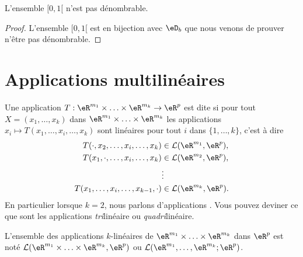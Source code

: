 \begin{corollary}
    L'ensemble \( \mathopen[ 0 , 1 [\) n'est pas dénombrable.
\end{corollary}

\begin{proof}
    L'ensemble \( \mathopen[ 0 , 1 [\) est en bijection avec \( \eD_b\) que nous venons de prouver n'être pas dénombrable.
\end{proof}

\section{Applications multilinéaires}

\begin{definition}       \label{DefFRHooKnPCT}
    Une application $T: \eR^{m_1}\times \ldots \times\eR^{m_k}\to\eR^p $ est dite  si pour tout $X=(x_1, \ldots,x_k)$ dans $ \eR^{m_1}\times \ldots \times\eR^{m_k}$ les applications $x_i\mapsto T(x_1, \ldots, x_i,\ldots,x_k)$ sont linéaires pour tout $i$ dans $\{1,\ldots,k\}$, c'est à dire
	\begin{equation}
		\begin{aligned}[]
			T(\cdot,x_2, \ldots, x_i,\ldots,x_k)&\in \mathcal{L}(\eR^{m_1}, \eR^p),\\
			T(x_1,\cdot, \ldots, x_i,\ldots,x_k)&\in \mathcal{L}(\eR^{m_2}, \eR^p),\\
						& \vdots\\
			T(x_1, \ldots, x_i,\ldots,x_{k-1},\cdot)&\in \mathcal{L}(\eR^{m_k}, \eR^p).\\
		\end{aligned}
	\end{equation}
	En particulier lorsque $k=2$, nous parlons d'applications . Vous pouvez deviner ce que sont les applications \emph{tri}linéaire ou \emph{quadri}linéaire.
\end{definition}

L'ensemble des applications $k$-linéaires de $ \eR^{m_1}\times \ldots \times\eR^{m_k}$ dans $\eR^p$ est noté $\mathcal{L}(\eR^{m_1}\times \ldots \times\eR^{m_k}, \eR^p)$ ou $\mathcal{L}(\eR^{m_1}, \ldots,\eR^{m_k}; \eR^p)$.

